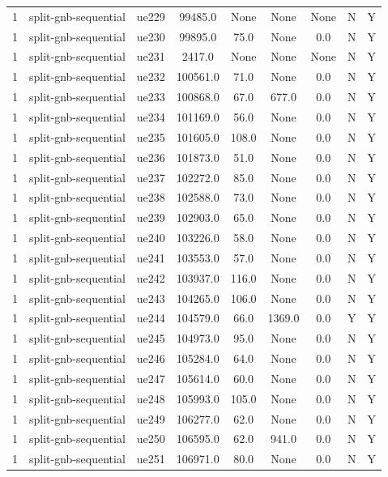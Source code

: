 \begin{table}[ht]
\begin{tabular}{|c|c|c|c|c|c|c|c|c|}
1 & split-gnb-sequential & ue229 & 99485.0 & None & None & None & N & Y \\
1 & split-gnb-sequential & ue230 & 99895.0 & 75.0 & None & 0.0 & N & Y \\
1 & split-gnb-sequential & ue231 & 2417.0 & None & None & None & N & Y \\
1 & split-gnb-sequential & ue232 & 100561.0 & 71.0 & None & 0.0 & N & Y \\
1 & split-gnb-sequential & ue233 & 100868.0 & 67.0 & 677.0 & 0.0 & N & Y \\
1 & split-gnb-sequential & ue234 & 101169.0 & 56.0 & None & 0.0 & N & Y \\
1 & split-gnb-sequential & ue235 & 101605.0 & 108.0 & None & 0.0 & N & Y \\
1 & split-gnb-sequential & ue236 & 101873.0 & 51.0 & None & 0.0 & N & Y \\
1 & split-gnb-sequential & ue237 & 102272.0 & 85.0 & None & 0.0 & N & Y \\
1 & split-gnb-sequential & ue238 & 102588.0 & 73.0 & None & 0.0 & N & Y \\
1 & split-gnb-sequential & ue239 & 102903.0 & 65.0 & None & 0.0 & N & Y \\
1 & split-gnb-sequential & ue240 & 103226.0 & 58.0 & None & 0.0 & N & Y \\
1 & split-gnb-sequential & ue241 & 103553.0 & 57.0 & None & 0.0 & N & Y \\
1 & split-gnb-sequential & ue242 & 103937.0 & 116.0 & None & 0.0 & N & Y \\
1 & split-gnb-sequential & ue243 & 104265.0 & 106.0 & None & 0.0 & N & Y \\
1 & split-gnb-sequential & ue244 & 104579.0 & 66.0 & 1369.0 & 0.0 & Y & Y \\
1 & split-gnb-sequential & ue245 & 104973.0 & 95.0 & None & 0.0 & N & Y \\
1 & split-gnb-sequential & ue246 & 105284.0 & 64.0 & None & 0.0 & N & Y \\
1 & split-gnb-sequential & ue247 & 105614.0 & 60.0 & None & 0.0 & N & Y \\
1 & split-gnb-sequential & ue248 & 105993.0 & 105.0 & None & 0.0 & N & Y \\
1 & split-gnb-sequential & ue249 & 106277.0 & 62.0 & None & 0.0 & N & Y \\
1 & split-gnb-sequential & ue250 & 106595.0 & 62.0 & 941.0 & 0.0 & N & Y \\
1 & split-gnb-sequential & ue251 & 106971.0 & 80.0 & None & 0.0 & N & Y \\

\end{tabular}
\end{table}
